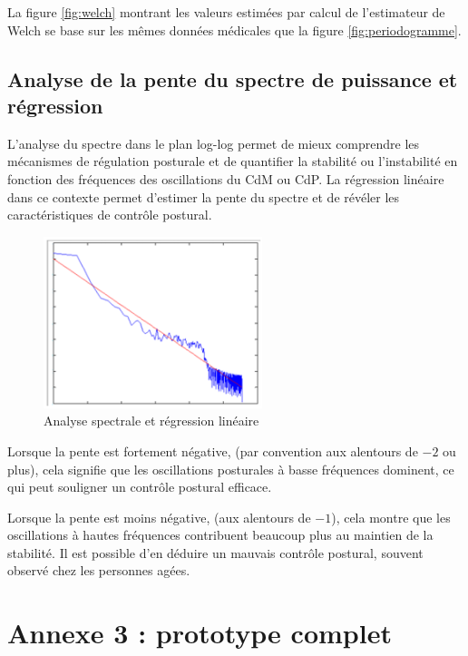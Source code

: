La figure \ref{fig:welch} montrant les valeurs estimées par calcul de l'estimateur de Welch se base sur les mêmes données médicales que la figure \ref{fig:periodogramme}.

\subsection{Analyse de la pente du spectre de puissance et régression}
\label{subsubsec:pente}

L’analyse du spectre dans le plan log-log permet de mieux comprendre les mécanismes de régulation posturale et de quantifier la stabilité ou l’instabilité en fonction des fréquences des oscillations du CdM ou CdP. 
La régression linéaire dans ce contexte permet d’estimer la pente du spectre et de révéler les caractéristiques de contrôle postural.


\begin{figure}[ht]
    \centering
    \includegraphics[height=5cm]{images/methode/analyse_spec_regre_lin.png}
    \caption{Analyse spectrale et régression linéaire}\label{fig:regression_lineaire}
\end{figure}

Lorsque la pente est fortement négative, (par convention aux alentours de $-2$ ou plus), cela signifie que les oscillations posturales à basse fréquences dominent, ce qui peut souligner un contrôle postural efficace.

Lorsque la pente est moins négative, (aux alentours de $-1$), cela montre que les oscillations à hautes fréquences contribuent beaucoup plus au maintien de la stabilité.
Il est possible d'en déduire un mauvais contrôle postural, souvent observé chez les personnes agées.

\newpage
\section{Annexe 3 : prototype complet}

